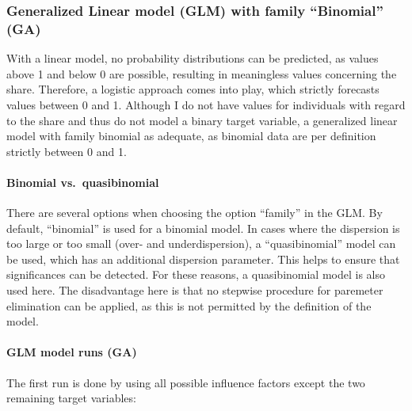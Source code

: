 \documentclass[
]{article}
\begin{document}
\hypertarget{generalized-linear-model-glm-with-family-binomial-ga}{%
\subsubsection{Generalized Linear model (GLM) with family ``Binomial''
(GA)}\label{generalized-linear-model-glm-with-family-binomial-ga}}

With a linear model, no probability distributions can be predicted, as
values above 1 and below 0 are possible, resulting in meaningless values
concerning the share. Therefore, a logistic approach comes into play,
which strictly forecasts values between 0 and 1. Although I do not have
values for individuals with regard to the share and thus do not model a
binary target variable, a generalized linear model with family binomial
as adequate, as binomial data are per definition strictly between 0 and
1.

\hypertarget{binomial-vs.-quasibinomial}{%
\paragraph{\texorpdfstring{Binomial
vs.~quasibinomial\newline}{Binomial vs.~quasibinomial}}\label{binomial-vs.-quasibinomial}}

There are several options when choosing the option ``family'' in the
GLM. By default, ``binomial'' is used for a binomial model. In cases
where the dispersion is too large or too small (over- and
underdispersion), a ``quasibinomial'' model can be used, which has an
additional dispersion parameter. This helps to ensure that significances
can be detected. For these reasons, a quasibinomial model is also used
here. The disadvantage here is that no stepwise procedure for paremeter
elimination can be applied, as this is not permitted by the definition
of the model.

\hypertarget{glm-model-runs-ga}{%
\paragraph{\texorpdfstring{GLM model runs
(GA)\newline}{GLM model runs (GA)}}\label{glm-model-runs-ga}}

The first run is done by using all possible influence factors except the
two remaining target variables:
\end{document}
